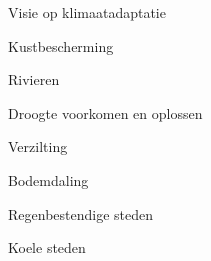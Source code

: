 
\begin{visie-concept}{Visie op klimaatadaptatie}\end{visie-concept}

\begin{voorstel-concept}{Kustbescherming}\end{voorstel-concept}
\begin{voorstel-concept}{Rivieren}\end{voorstel-concept}
\begin{voorstel-concept}{Droogte voorkomen en oplossen}\end{voorstel-concept}
\begin{voorstel-concept}{Verzilting}\end{voorstel-concept}
\begin{voorstel-concept}{Bodemdaling}\end{voorstel-concept}
\begin{voorstel-concept}{Regenbestendige steden}\end{voorstel-concept}
\begin{voorstel-concept}{Koele steden}\end{voorstel-concept}

